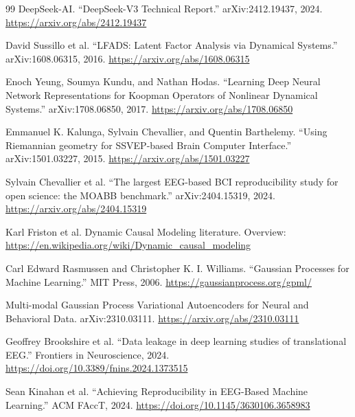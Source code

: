 \documentclass[11pt]{article}
\begin{document}
\begin{thebibliography}{99}
DeepSeek-AI. ``DeepSeek-V3 Technical Report.'' arXiv:2412.19437, 2024. \url{https://arxiv.org/abs/2412.19437}

David Sussillo et al. ``LFADS: Latent Factor Analysis via Dynamical Systems.'' arXiv:1608.06315, 2016. \url{https://arxiv.org/abs/1608.06315}

Enoch Yeung, Soumya Kundu, and Nathan Hodas. ``Learning Deep Neural Network Representations for Koopman Operators of Nonlinear Dynamical Systems.'' arXiv:1708.06850, 2017. \url{https://arxiv.org/abs/1708.06850}

Emmanuel K. Kalunga, Sylvain Chevallier, and Quentin Barthelemy. ``Using Riemannian geometry for SSVEP-based Brain Computer Interface.'' arXiv:1501.03227, 2015. \url{https://arxiv.org/abs/1501.03227}

Sylvain Chevallier et al. ``The largest EEG-based BCI reproducibility study for open science: the MOABB benchmark.'' arXiv:2404.15319, 2024. \url{https://arxiv.org/abs/2404.15319}

Karl Friston et al. Dynamic Causal Modeling literature. Overview: \url{https://en.wikipedia.org/wiki/Dynamic_causal_modeling}

Carl Edward Rasmussen and Christopher K. I. Williams. ``Gaussian Processes for Machine Learning.'' MIT Press, 2006. \url{https://gaussianprocess.org/gpml/}

Multi-modal Gaussian Process Variational Autoencoders for Neural and Behavioral Data. arXiv:2310.03111. \url{https://arxiv.org/abs/2310.03111}

Geoffrey Brookshire et al. ``Data leakage in deep learning studies of translational EEG.'' Frontiers in Neuroscience, 2024. \url{https://doi.org/10.3389/fnins.2024.1373515}

Sean Kinahan et al. ``Achieving Reproducibility in EEG-Based Machine Learning.'' ACM FAccT, 2024. \url{https://doi.org/10.1145/3630106.3658983}

\end{thebibliography}
\end{document}
